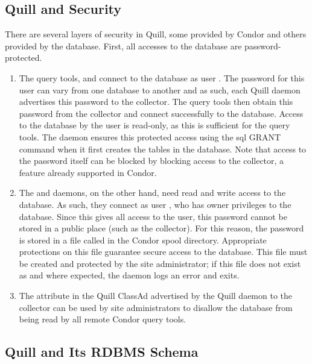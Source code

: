 \subsection{\label{sec:Quill-Security}Quill and Security}

There are several layers of security in Quill, some provided by Condor and
others provided by the database.  First, all accesses to the database
are password-protected.

\begin{enumerate}
\item The query tools,  and
 connect to the database as user .
The password for this user can vary from one database to another and
as such, each Quill daemon advertises this password to the collector.
The query tools then obtain this password from the collector and
connect successfully to the database.  Access to the database by the
 user is read-only, as this is sufficient for the
query tools.  The  daemon ensures this protected access using the sql
GRANT command when it first creates the tables in the database.  Note that
access to the  password itself can be blocked by
blocking access to the collector, a feature already supported in Condor.

\item The  and  daemons, on the other hand,
need read and write access to the database.
As such, they connect as user ,
who has owner privileges to the database.  Since this gives all
access to the  user, this password cannot
be stored in a public place (such as the collector).  For this
reason, the  password is stored in a file called
 in the Condor spool directory.
Appropriate protections on this file guarantee secure access to the database.
This file must be created and protected by the site administrator;
if this file does not exist as and where expected, the 
daemon logs an error and exits.

\item The  attribute in the Quill ClassAd advertised
by the Quill daemon to the collector can be used by site administrators
to disallow the database from being read by all remote Condor query tools.

\end{enumerate}

\subsection{\label{sec:Quill-Schema}Quill and Its RDBMS Schema}


